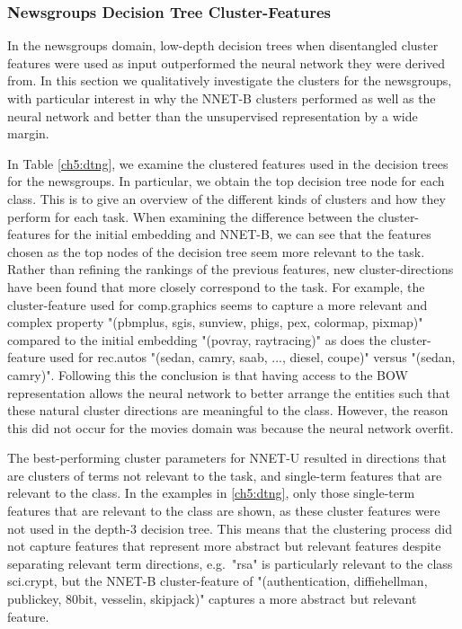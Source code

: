 \subsubsection{Newsgroups Decision Tree Cluster-Features}\label{ch5:newsgroupsquant}

In the newsgroups domain, low-depth decision trees when disentangled cluster features were used as input outperformed the neural network they were derived from. In this section we qualitatively investigate the clusters for the newsgroups, with particular interest in why the NNET-B clusters performed as well as the neural network and better than the unsupervised representation by a wide margin.

In Table \ref{ch5:dtng}, we examine the clustered features used in the decision trees for the newsgroups. In particular, 
we obtain the top decision tree node for each class. This is to give an overview of the different kinds of clusters and how they perform for each task. When examining the difference between the cluster-features for the initial embedding and NNET-B, we can see that the features chosen as the top nodes of the decision tree seem more relevant to the task. Rather than refining the rankings of the previous features, new cluster-directions have been found that more closely correspond to the task. For example, the cluster-feature used for comp.graphics seems to capture a more relevant and complex property  "(pbmplus, sgis, sunview, phigs, pex, colormap, pixmap)" compared to the initial embedding "(povray, raytracing)" as does the cluster-feature used for rec.autos "(sedan, camry, saab, ..., diesel, coupe)" versus "(sedan, camry)". Following this the conclusion is that having access to the BOW representation allows the neural network to better arrange the entities such that these natural cluster directions are meaningful to the class. However, the reason this did not occur for the movies domain was because the neural network overfit. 

The best-performing cluster parameters for  NNET-U resulted in directions that are clusters of terms not relevant to the task, and single-term features that are relevant to the class. In the examples in \ref{ch5:dtng}, only those single-term features that are relevant to the class are shown, as these  cluster features were not used in the depth-3 decision tree. This means that the clustering process did not capture features that represent more abstract but relevant features despite separating relevant term directions, e.g.\  "rsa" is particularly relevant to the class sci.crypt, but the NNET-B cluster-feature of  "(authentication, diffiehellman, publickey, 80bit, vesselin, skipjack)" captures a more abstract but relevant feature.  %




